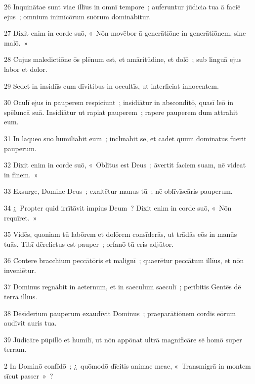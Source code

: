 \psalmVerse
  {\phantom{0}26}
  {Inquinātae sunt viae illīus in omnī tempore~; auferuntur jūdicia tua ā faciē ejus~; omnium inimīcōrum suōrum dominābitur.}


\psalmVerse
  {\phantom{0}27}
  {Dixit enim in corde suō, «~Nōn movēbor ā generātiōne in generātiōnem, sine malō.~»}


\psalmVerse
  {\phantom{0}28}
  {Cujus maledictiōne ōs plēnum est, et amāritūdine, et dolō~; sub linguā ejus labor et dolor.}


\psalmVerse
  {\phantom{0}29}
  {Sedet in insidiīs cum dīvitibus in occultīs, ut interficiat innocentem.}


\psalmVerse
  {\phantom{0}30}
  {Oculī ejus in pauperem respiciunt~; insidiātur in absconditō, quasī leō in spēluncā suā. Insidiātur ut rapiat pauperem~; rapere pauperem dum attrahit eum.}


\psalmVerse
  {\phantom{0}31}
  {In laqueō suō humiliābit eum~; inclīnābit sē, et cadet quum dominātus fuerit pauperum.}


\psalmVerse
  {\phantom{0}32}
  {Dixit enim in corde suō, «~Oblītus est Deus~; āvertit faciem suam, nē videat in fīnem.~»}


\psalmVerse
  {\phantom{0}33}
  {Exsurge, Domine Deus~; exaltētur manus tū~; nē oblīvīscāris pauperum.}


\psalmVerse
  {\phantom{0}34}
  {¿~Propter quid irrītāvit impius Deum~? Dixit enim in corde suō, «~Nōn requīret.~»}


\psalmVerse
  {\phantom{0}35}
  {Vidēs, quoniam tū labōrem et dolōrem consīderās, ut trādās eōs in manūs tuās. Tibī dērelictus est pauper~; orfanō tū eris adjūtor.}


\psalmVerse
  {\phantom{0}36}
  {Contere bracchium peccātōris et malignī~; quaerētur peccātum illīus, et nōn inveniētur.}


\psalmVerse
  {\phantom{0}37}
  {Dominus regnābit in aeternum, et in saeculum saeculī~; perībitis Gentēs dē terrā illīus.}


\psalmVerse
  {\phantom{0}38}
  {Dēsīderium pauperum exaudīvit Dominus~; praeparātiōnem cordis eōrum audīvit auris tua.}


\psalmVerse
  {\phantom{0}39}
  {Jūdicāre pūpillō et humilī, ut nōn appōnat ultrā magnificāre sē homō super terram.}



\psalmVerse
  {\phantom{00}2}
  {In Dominō confīdō~; ¿~quōmodō dīcitis animae meae, «~Transmigrā in montem sīcut passer~»~?}


